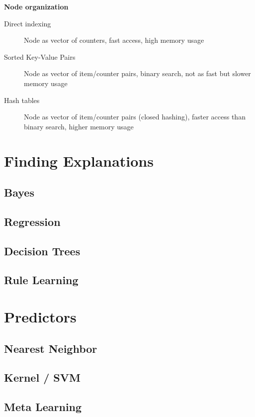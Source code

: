 \documentclass[fleqn, oneside, 10pt, titlepage]{article}
\begin{document}
\textbf{Node organization}
\begin{description}
	\item[Direct indexing] Node as vector of counters, fast access, high memory usage
	\item[Sorted Key-Value Pairs] Node as vector of item/counter pairs, binary search, not as fast but slower memory usage
	\item[Hash tables] Node as vector of item/counter pairs (closed hashing), faster access than binary search, higher memory usage
\end{description}

\section{Finding Explanations}
\subsection{Bayes}
\subsection{Regression}
\subsection{Decision Trees}
\subsection{Rule Learning}
\section{Predictors}
\subsection{Nearest Neighbor}
\subsection{Kernel / SVM}
\subsection{Meta Learning}
\end{document}
